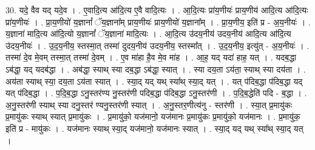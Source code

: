 \documentclass[17pt]{extarticle}
\begin{document}
30. यदे॒ वैव यद् यदे॒व । . ए॒वादि॒त्य आ॑दि॒त्य ए॒वै वादि॒त्यः । . आ॒दि॒त्यः प्रा॑य॒णीयः॑ प्राय॒णीय॑ आदि॒त्य आ॑दि॒त्यः प्रा॑य॒णीयः॑ । . प्रा॒य॒णीयो॑ य॒ज्ञानां᳚ ॅय॒ज्ञाना᳚म् प्राय॒णीयः॑ प्राय॒णीयो॑ य॒ज्ञाना᳚म् । . प्रा॒य॒णीय॒ इति॑ प्र - अ॒य॒नीयः॑ । . य॒ज्ञाना॑ मादि॒त्य आ॑दि॒त्यो य॒ज्ञानां᳚ ॅय॒ज्ञाना॑ मादि॒त्यः । . आ॒दि॒त्य उ॑दय॒नीय॑ उदय॒नीय॑ आदि॒त्य आ॑दि॒त्य उ॑दय॒नीयः॑ । . उ॒द॒य॒नीय॒ स्तस्मा॒त् तस्मा॑ दुदय॒नीय॑ उदय॒नीय॒ स्तस्मा᳚त् । . उ॒द॒य॒नीय॒ इत्यु॑त् - अ॒य॒नीयः॑ । . तस्मा॑ दे॒व मे॒वम् तस्मा॒त् तस्मा॑ दे॒वम् । . ए॒व मा॑हा है॒व मे॒व मा॑ह । . आ॒ह॒ यद् यदा॑ हाह॒ यत् । . यदब॒द्धा ऽब॑द्धा॒ यद् यदब॑द्धा । . अब॑द्धा॒ स्याथ् स्या दब॒द्धा ऽब॑द्धा॒ स्यात् । . स्या दय॒ता ऽय॑ता॒ स्याथ् स्या दय॑ता । . अय॑ता स्याथ् स्या॒ दय॒ता ऽय॑ता स्यात् । . स्या॒द् यद् यथ् स्या᳚थ् स्या॒द् यत् । . यत् प॑दिब॒द्धा प॑दिब॒द्धा यद् यत् प॑दिब॒द्धा । . प॒दि॒ब॒द्धा ऽनु॒स्तर॑ण्य नु॒स्तर॑णी पदिब॒द्धा प॑दिब॒द्धा ऽनु॒स्तर॑णी । . प॒दि॒ब॒द्धेति॑ पदि - ब॒द्धा । . अ॒नु॒स्तर॑णी स्याथ् स्या दनु॒स्तर॑ ण्यनु॒स्तर॑णी स्यात् । . अ॒नु॒स्तर॒णीत्य॑नु - स्तर॑णी । . स्या॒त् प्र॒मायु॑कः प्र॒मायु॑कः स्याथ् स्यात् प्र॒मायु॑कः । . प्र॒मायु॑को॒ यज॑मानो॒ यज॑मानः प्र॒मायु॑कः प्र॒मायु॑को॒ यज॑मानः । . प्र॒मायु॑क॒ इति॑ प्र - मायु॑कः । . यज॑मानः स्याथ् स्या॒द् यज॑मानो॒ यज॑मानः स्यात् । . स्या॒द् यद् यथ् स्या᳚थ् स्या॒द् यत् । \newline
\end{document}
